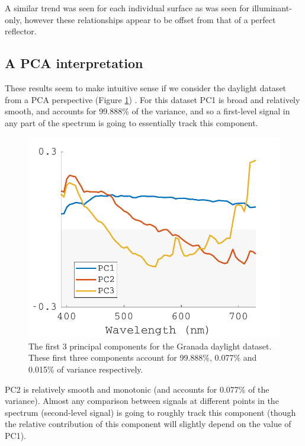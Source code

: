 A similar trend was seen for each individual surface as was seen for illuminant-only, however these relationships appear to be offset from that of a perfect reflector.

\subsection{A PCA interpretation}

These results seem to make intuitive sense if we consider the daylight dataset from a \gls{PCA} perspective (Figure \ref{fig:melPCA})%
. For this dataset \gls{PC1} is broad and relatively smooth, and accounts for 99.888\% of the variance, and so a first-level signal in any part of the spectrum is going to essentially track this component. 

\begin{figure}[htbp]
 \includegraphics[max width=\textwidth]{figs/comp/melcomp_3/PC.pdf} %
 \caption{The first 3 principal components for the Granada daylight dataset. These first three components account for 99.888\%, 0.077\% and 0.015\% of variance respectively.}
 \label{fig:melPCA}
\end{figure} 

\Gls{PC2} is relatively smooth and monotonic (and accounts for 0.077\% of the variance). Almost any comparison between signals at different points in the spectrum (second-level signal) is going to roughly track this component (though the relative contribution of this component will slightly depend on the value of \gls{PC1}).

